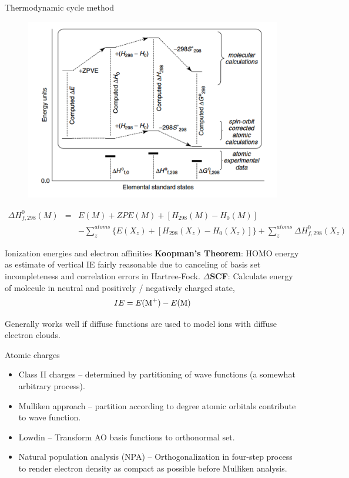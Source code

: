 \documentclass[aspectratio=169]{beamer}
\begin{document}
\begin{frame}{Thermodynamic cycle method}
\begin{figure}
    \centering
    \includegraphics[width=0.4\linewidth]{lectures/figures/4_energy_diagram.png}
\end{figure}
\begin{eqnarray*}
    \Delta H_{f,298}^0(M) & = & E(M) + ZPE(M) + [H_{298}(M) - H_0(M)]\\
    && - \sum_z^{atoms} \{E(X_z)+[H_{298}(X_z) - H_0(X_z)]\} + \sum_z^{atoms}\Delta H_{f,298}^0(X_z)
\end{eqnarray*}

\end{frame} 

\begin{frame}{Ionization energies and electron affinities}
\textbf{Koopman’s Theorem}: HOMO energy as estimate of vertical IE fairly reasonable due to canceling of basis set incompleteness and correlation errors in Hartree-Fock.\newline
\newline
\textbf{$\Delta$SCF}: Calculate energy of molecule in neutral and positively / negatively charged state,
\begin{equation*}
    IE = E(\ce{M+}) - E(\ce{M}) 
\end{equation*}

Generally works well if diffuse functions are used to model ions with diffuse electron clouds.
\end{frame} 

\begin{frame}{Atomic charges}
\begin{itemize}
    \item Class II charges – determined by partitioning of wave functions (a somewhat arbitrary process).
    \item Mulliken approach – partition according to degree atomic orbitals contribute to wave function.
    \item Lowdin – Transform AO basis functions to orthonormal set.
    \item Natural population analysis (NPA) – Orthogonalization in four-step process to render electron density as compact as possible before Mulliken analysis.
\end{itemize}

\end{frame} 
\end{document}
